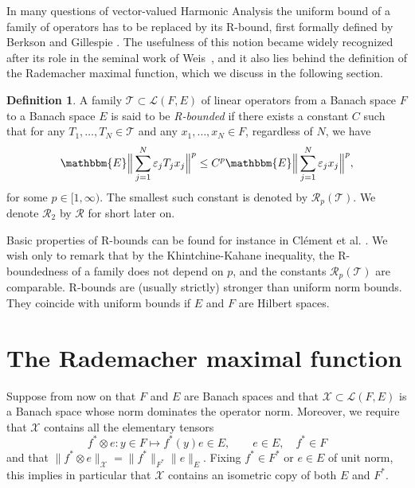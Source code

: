 \documentclass[a4paper,10pt]{amsart}
\theoremstyle{plain}
\theoremstyle{definition}
\newtheorem*{definition*}{Definition}
\theoremstyle{remark}
\begin{document}
In many questions of vector-valued Harmonic Analysis 
the uniform bound of a family of operators has to be replaced by its R-bound, first formally defined
by Berkson and Gillespie \cite{BERKSONGILLESPIE}.
The usefulness of this notion became widely recognized after its role in the seminal work of Weis~\cite{WEIS},
and it also lies behind the definition of the Rademacher maximal function, which we discuss in the following section.

\begin{definition*}
  A family $\mathcal{T} \subset \mathcal{L}(F,E)$ of linear operators from a Banach
  space $F$ to a Banach space $E$ is said to be \emph{R-bounded} if there
  exists a constant $C$ such that for any $T_1,\ldots , T_N \in \mathcal{T}$ and any 
  $x_1,\ldots , x_N \in F$, regardless of $N$, we have
  \begin{equation*}
    {\mathbbm{E}}  \Big\| \sum_{j=1}^N \varepsilon_j T_j x_j \Big\|^p 
    \leq C^p {\mathbbm{E}} \Big\| \sum_{j=1}^N \varepsilon_j x_j \Big\|^p ,
  \end{equation*}
  for some $p\in [1, \infty )$. 
  The smallest such constant is denoted by $\mathcal{R}_p (\mathcal{T})$. We denote $\mathcal{R}_2$ by $\mathcal{R}$
  for short later on.
\end{definition*}

Basic properties of R-bounds can be found for instance in Clément et al. \cite{CLEMENT}. We wish only to remark that
by the Khintchine-Kahane inequality, the R-boundedness of a family does not depend on $p$, and the constants
$\mathcal{R}_p (\mathcal{T})$ are comparable. R-bounds are (usually strictly) stronger than uniform norm bounds. They coincide with uniform bounds if $E$ and $F$ are Hilbert spaces.

\section{The Rademacher maximal function}

Suppose from now on that $F$ and $E$ are Banach spaces and that $\mathcal{X}\subset \mathcal{L}(F,E)$ is a Banach space
whose norm dominates the operator norm. Moreover, we require that $\mathcal{X}$ contains all the elementary tensors
\begin{equation*}
   f^*\otimes e:y\in F\mapsto f^*(y)e\in E,\qquad e\in E,\quad f^*\in F
\end{equation*}
and that $\|f^*\otimes e\|_{\mathcal{X}}=\|f^*\|_{F^*}\|e\|_E$. Fixing $f^*\in F^*$ or $e\in E$ of unit norm, this implies in particular that $\mathcal{X}$ contains an isometric copy of both $E$ and $F^*$.
\end{document}
